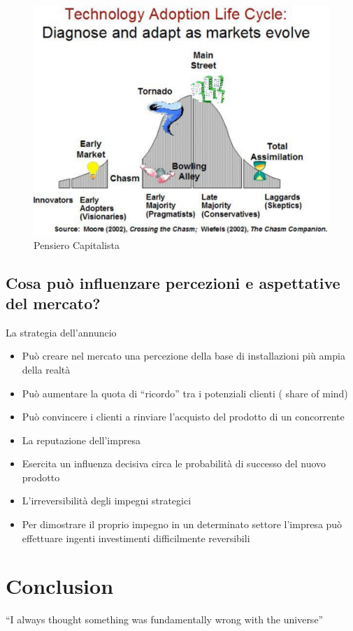 \documentclass{article}
\begin{document}
\begin{figure}[h!]
	\centering
	\includegraphics[scale=0.3]{images/Markadopters.png}
	\caption{Pensiero Capitalista}
	\label{fig:cap}
\end{figure} 

\subsection{Cosa può influenzare percezioni e aspettative del mercato?}
La strategia dell’annuncio
\begin{itemize}
	\item Può creare nel mercato una percezione della base di installazioni più
	ampia della realtà
	\item Può aumentare la quota di “ricordo” tra i potenziali clienti ( share of mind)
	\item Può convincere i clienti a rinviare l’acquisto del prodotto di un
	concorrente
	\item La reputazione dell’impresa
	\item Esercita un influenza decisiva circa le probabilità di successo del nuovo
	prodotto
	\item L’irreversibilità degli impegni strategici
	\item Per dimostrare il proprio impegno in un determinato settore l’impresa può
	effettuare ingenti investimenti difficilmente reversibili
	
\end{itemize}




\section{Conclusion}
``I always thought something was fundamentally wrong with the universe'' \citep{adams1995hitchhiker}



\end{document}

